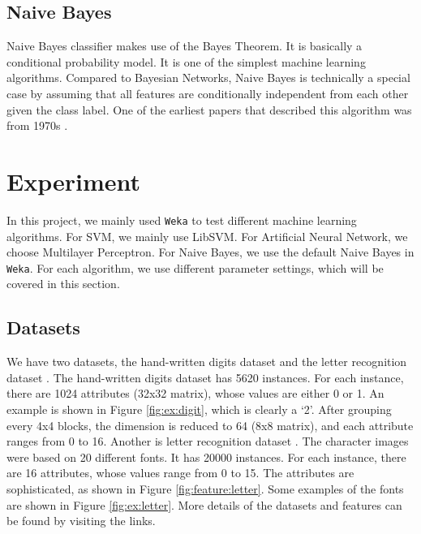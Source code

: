\documentclass[11pt]{article}
\begin{document}
\subsection{Naive Bayes}
Naive Bayes classifier makes use of the Bayes Theorem. It is basically a conditional probability model. It is one of the simplest machine learning algorithms. Compared to Bayesian Networks, Naive Bayes is technically a special case by assuming that all features are conditionally independent from each other given the class label. One of the earliest papers that described this algorithm was from 1970s \cite{duda1973pattern}. 

\section{Experiment}\label{exp}
In this project, we mainly used \texttt{Weka} \cite{hall2009weka} to test different machine learning algorithms. For SVM, we mainly use LibSVM. For Artificial Neural Network, we choose Multilayer Perceptron. For Naive Bayes, we use the default Naive Bayes in \texttt{Weka}. For each algorithm, we use different parameter settings, which will be covered in this section.

\subsection{Datasets}
We have two datasets, the hand-written digits dataset \cite{digitdataset} and the letter recognition dataset \cite{letterdataset}. The hand-written digits dataset has 5620 instances. For each instance, there are 1024 attributes (32x32 matrix), whose values are either 0 or 1. An example is shown in Figure \ref{fig:ex:digit}, which is clearly a `2'. After grouping every 4x4 blocks, the dimension is reduced to 64 (8x8 matrix), and each attribute ranges from 0 to 16. Another is letter recognition dataset \cite{letterdataset}. The character images were based on 20 different fonts. It has 20000 instances. For each instance, there are 16 attributes, whose values range from 0 to 15. The attributes are sophisticated, as shown in Figure \ref{fig:feature:letter}. Some examples of the fonts are shown in Figure \ref{fig:ex:letter}. More details of the datasets and features can be found by visiting the links.
\end{document}
